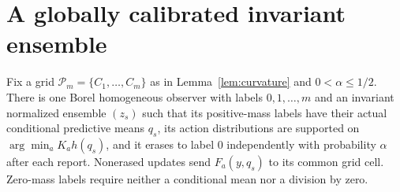\section{A globally calibrated invariant ensemble}\label{sec:calibration}
\begin{lemma}\label{lem:fixedpoint}
Fix a grid $\mathcal P_m=\{C_1,\ldots,C_m\}$ as in Lemma~\ref{lem:curvature} and $0<\alpha\le1/2$. There is one Borel homogeneous observer with labels $0,1,\ldots,m$ and an invariant normalized ensemble $(z_s)$ such that its positive-mass labels have their actual conditional predictive means $q_s$, its action distributions are supported on $\arg\min_aK_ah(q_s)$, and it erases to label $0$ independently with probability $\alpha$ after each report. Nonerased updates send $F_a(y,q_s)$ to its common grid cell. Zero-mass labels require neither a conditional mean nor a division by zero.
\end{lemma}

